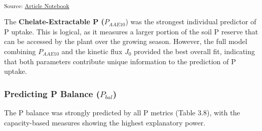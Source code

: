 \documentclass[
  a4paper,
]{article}
\begin{document}
\textsubscript{Source:
\href{https://Andrapodon.github.io/Master-Thesis-P-kinetics/index.qmd.html}{Article
Notebook}}

The \textbf{Chelate-Extractable P (}\(P_{AAE10}\)) was the strongest
individual predictor of P uptake. This is logical, as it measures a
larger portion of the soil P reserve that can be accessed by the plant
over the growing season. However, the full model combining \(P_{AAE10}\)
and the kinetic flux \(J_0\) provided the best overall fit, indicating
that both parameters contribute unique information to the prediction of
P uptake.

\subsubsection{\texorpdfstring{Predicting P Balance
(\(P_{bal}\))}{Predicting P Balance (P\_\{bal\})}}\label{predicting-p-balance-p_bal}

The P balance was strongly predicted by all P metrics (Table 3.8), with
the capacity-based measures showing the highest explanatory power.
\end{document}
